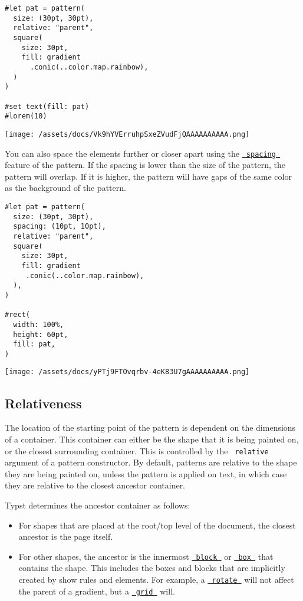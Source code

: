 \begin{verbatim}
#let pat = pattern(
  size: (30pt, 30pt),
  relative: "parent",
  square(
    size: 30pt,
    fill: gradient
      .conic(..color.map.rainbow),
  )
)

#set text(fill: pat)
#lorem(10)
\end{verbatim}

\texttt{[image: /assets/docs/Vk9hYVErruhpSxeZVudFjQAAAAAAAAAA.png]}

You can also space the elements further or closer apart using the
\href{/docs/reference/visualize/pattern/\#parameters-spacing}{\texttt{\ spacing\ }}
feature of the pattern. If the spacing is lower than the size of the
pattern, the pattern will overlap. If it is higher, the pattern will
have gaps of the same color as the background of the pattern.

\begin{verbatim}
#let pat = pattern(
  size: (30pt, 30pt),
  spacing: (10pt, 10pt),
  relative: "parent",
  square(
    size: 30pt,
    fill: gradient
     .conic(..color.map.rainbow),
  ),
)

#rect(
  width: 100%,
  height: 60pt,
  fill: pat,
)
\end{verbatim}

\texttt{[image: /assets/docs/yPTj9FTOvqrbv-4eK83U7gAAAAAAAAAA.png]}

\subsection{Relativeness}\label{relativeness}

The location of the starting point of the pattern is dependent on the
dimensions of a container. This container can either be the shape that
it is being painted on, or the closest surrounding container. This is
controlled by the \texttt{\ relative\ } argument of a pattern
constructor. By default, patterns are relative to the shape they are
being painted on, unless the pattern is applied on text, in which case
they are relative to the closest ancestor container.

Typst determines the ancestor container as follows:

\begin{itemize}
\tightlist
\item
  For shapes that are placed at the root/top level of the document, the
  closest ancestor is the page itself.
\item
  For other shapes, the ancestor is the innermost
  \href{/docs/reference/layout/block/}{\texttt{\ block\ }} or
  \href{/docs/reference/layout/box/}{\texttt{\ box\ }} that contains the
  shape. This includes the boxes and blocks that are implicitly created
  by show rules and elements. For example, a
  \href{/docs/reference/layout/rotate/}{\texttt{\ rotate\ }} will not
  affect the parent of a gradient, but a
  \href{/docs/reference/layout/grid/}{\texttt{\ grid\ }} will.
\end{itemize}

